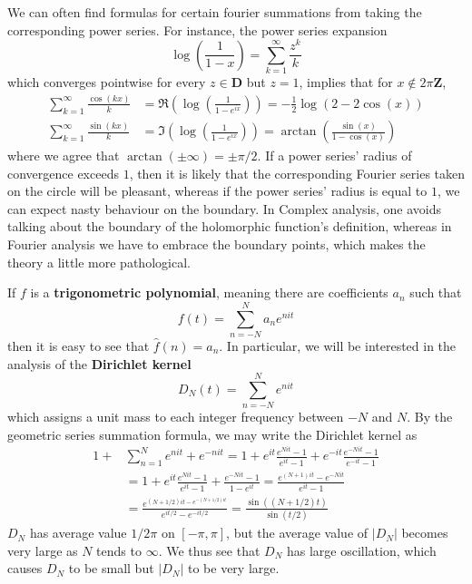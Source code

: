 \begin{example}
    We can often find formulas for certain fourier summations from taking the corresponding power series. For instance, the power series expansion
    \[ \log \left( \frac{1}{1-x} \right) = \sum_{k = 1}^\infty \frac{z^k}{k} \]
    which converges pointwise for every $z \in \mathbf{D}$ but $z = 1$, implies that for $x \not \in 2 \pi \mathbf{Z}$,
    \begin{align*}
        \sum_{k = 1}^\infty \frac{\cos(kx)}{k} &= \Re \left( \log \left( \frac{1}{1 - e^{ix}} \right) \right) = -\frac{1}{2} \log(2 - 2\cos(x))\\
        \sum_{k = 1}^\infty \frac{\sin(kx)}{k} &= \Im \left( \log \left( \frac{1}{1 - e^{ix}} \right) \right) = \arctan \left( \frac{\sin(x)}{1 - \cos(x)} \right)
    \end{align*}
    where we agree that $\arctan(\pm \infty) = \pm \pi/2$. If a power series' radius of convergence exceeds $1$, then it is likely that the corresponding Fourier series taken on the circle will be pleasant, whereas if the power series' radius is equal to $1$, we can expect nasty behaviour on the boundary. In Complex analysis, one avoids talking about the boundary of the holomorphic function's definition, whereas in Fourier analysis we have to embrace the boundary points, which makes the theory a little more pathological.
\end{example}

\begin{example}
    If $f$ is a {\bf trigonometric polynomial}, meaning there are coefficients $a_n$ such that
    \[  f(t) = \sum_{n = -N}^N a_n e^{nit} \]
    then it is easy to see that $\widehat{f}(n) = a_n$. In particular, we will be interested in the analysis of the {\bf Dirichlet kernel}
    \[ D_N(t) = \sum_{n = -N}^N e^{nit} \]
    which assigns a unit mass to each integer frequency between $-N$ and $N$. By the geometric series summation formula, we may write the Dirichlet kernel as
    \begin{align*}
        1 + &\sum_{n = 1}^N e^{nit} + e^{-nit} = 1 + e^{it} \frac{e^{Nit} - 1}{e^{it} - 1} + e^{-it} \frac{e^{-Nit} - 1}{e^{-it} - 1}\\
        &= 1 + e^{it} \frac{e^{Nit} - 1}{e^{it} - 1} + \frac{e^{-Nit} - 1}{1 - e^{it}} = \frac{e^{(N+1)it} - e^{-Nit}}{e^{it} - 1}\\
        &= \frac{e^{(N+1/2)it - e^{-(N+1/2)it}}}{e^{it/2} - e^{-it/2}} = \frac{\sin((N + 1/2)t)}{\sin(t/2)}
    \end{align*}
    $D_N$ has average value $1/2\pi$ on $[-\pi,\pi]$, but the average value of $|D_N|$ becomes very large as $N$ tends to $\infty$. We thus see that $D_N$ has large oscillation, which causes $D_N$ to be small but $|D_N|$ to be very large.
\end{example}

